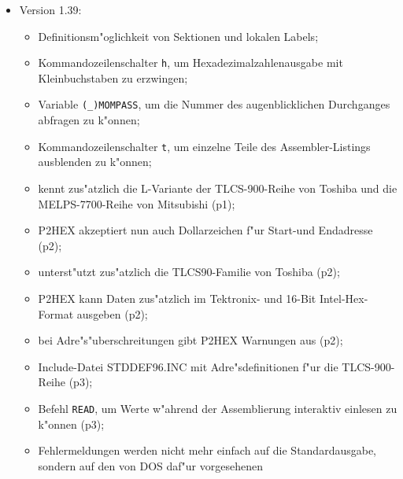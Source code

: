 \documentclass[12pt,a4paper,twoside]{report}
\newcommand{\tty}[1]{{\tt #1}}
\newcommand{\predefsym}[1]{{\tt (\_)#1}}
\begin{document}
\begin{itemize}
{\begin{itemize}
      \item{..sowie die 3201x-Signalprozessoren von Texas Instruments (p2);}
      \item{Option \tty{F} bei P2HEX, um die automatische Formatwahl "ubersteuern
            zu k"onnen (p2);}
      \item{P2BIN kann nun auch durch Angabe von Dollarzeichen Anfang und
            Ende des Adre"sfensters selbstst"andig festlegen (p2);}
      \item{Der 8048-Codegenerator kennt nun auch die 8041/42-
            Befehlserweiterungen(p2);}
      \item{unterst"utzt zus"atzlich die Zilog Z8-Mikrokontroller(p3).}
      \end{itemize}}
\item{Version 1.39:
      \begin{itemize}
      \item{Definitionsm"oglichkeit von Sektionen und lokalen Labels;}
      \item{Kommandozeilenschalter \tty{h}, um Hexadezimalzahlenausgabe mit
            Kleinbuchstaben zu erzwingen;}
      \item{Variable \predefsym{MOMPASS}, um die Nummer des augenblicklichen Durchganges
            abfragen zu k"onnen;}
      \item{Kommandozeilenschalter \tty{t}, um einzelne Teile des Assembler-Listings
            ausblenden zu k"onnen;}
      \item{kennt zus"atzlich die L-Variante der TLCS-900-Reihe von Toshiba
            und die MELPS-7700-Reihe von Mitsubishi (p1);}
      \item{P2HEX akzeptiert nun auch Dollarzeichen f"ur Start-und Endadresse
            (p2);}
      \item{unterst"utzt zus"atzlich die TLCS90-Familie von Toshiba (p2);}
      \item{P2HEX kann Daten zus"atzlich im Tektronix- und 16-Bit
            Intel-Hex-Format ausgeben (p2);}
      \item{bei Adre"s"uberschreitungen gibt P2HEX Warnungen aus (p2);}
      \item{Include-Datei STDDEF96.INC mit Adre"sdefinitionen f"ur die
            TLCS-900-Reihe (p3);}
      \item{Befehl \tty{READ}, um Werte w"ahrend der Assemblierung interaktiv
            einlesen zu k"onnen (p3);}
      \item{Fehlermeldungen werden nicht mehr einfach auf die
            Standardausgabe, sondern auf den von DOS daf"ur vorgesehenen
}
\end{itemize}}
\end{itemize}
\end{document}
